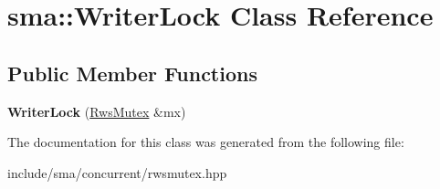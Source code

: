 \hypertarget{classsma_1_1WriterLock}{\section{sma\-:\-:Writer\-Lock Class Reference}
\label{classsma_1_1WriterLock}
}
\subsection*{Public Member Functions}
\begin{DoxyCompactItemize}
\item 
\hypertarget{classsma_1_1WriterLock_a91989780280e056f1f7e9698280ac2a7}{{\bfseries Writer\-Lock} (\hyperlink{structsma_1_1RwsMutex}{Rws\-Mutex} \&mx)}\label{classsma_1_1WriterLock_a91989780280e056f1f7e9698280ac2a7}

\end{DoxyCompactItemize}


The documentation for this class was generated from the following file\-:\begin{DoxyCompactItemize}
\item 
include/sma/concurrent/rwsmutex.\-hpp\end{DoxyCompactItemize}
